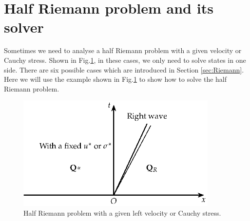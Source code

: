 \documentclass[review]{elsarticle}
\numberwithin{equation}{section}
\numberwithin{table}{section}
\begin{document}
%
%
%
\section{Half Riemann problem and its solver}
Sometimes we need to analyse a half Riemann problem with a given velocity or Cauchy stress. Shown in Fig.\ref{fig:half}, in these cases, we only need to solve states in one side. There are six possible cases which are introduced in Section \ref{sec:Riemann}. Here we will use the example shown in Fig.\ref{fig:half} to show how to solve the half Riemann problem.

\begin{figure}
  \centering
  \includegraphics[width= 10cm] {Tikz-figure8.eps}
  \caption{Half Riemann problem  with a given left velocity or Cauchy stress.}
  \label{fig:half}
\end{figure}
\end{document}
